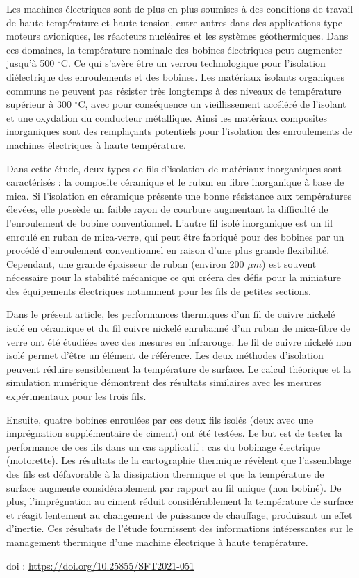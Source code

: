 {\normalsize
Les machines électriques sont de plus en plus soumises à des conditions de travail de haute température et haute tension, entre autres dans des applications type  moteurs avioniques, les réacteurs nucléaires et les systèmes géothermiques. Dans ces domaines, la température nominale des bobines électriques peut augmenter jusqu'à 500 $^{\circ}$C. Ce qui s'avère être un verrou technologique  pour  l'isolation diélectrique des enroulements et des bobines. Les matériaux isolants organiques communs ne peuvent pas résister très longtemps à des  niveaux de température supérieur à 300 $^{\circ}$C, avec pour conséquence un vieillissement accéléré de l'isolant et une oxydation du conducteur métallique. Ainsi les matériaux composites inorganiques sont des remplaçants potentiels pour l'isolation des enroulements de machines électriques à haute température.

Dans cette étude, deux types de fils d'isolation de matériaux inorganiques sont caractérisés : la composite céramique et le ruban en fibre inorganique à base de mica. Si l'isolation en céramique présente une bonne résistance aux températures élevées, elle possède un faible rayon de courbure augmentant la difficulté de l'enroulement de bobine conventionnel. L'autre fil isolé inorganique est un fil enroulé en ruban de mica-verre, qui peut être fabriqué pour des bobines par un procédé d'enroulement conventionnel en raison d'une plus grande flexibilité. Cependant, une grande épaisseur de ruban (environ 200 $\unit{\mu m}$) est souvent nécessaire pour la stabilité mécanique ce qui créera des défis pour la miniature des équipements électriques notamment pour les fils de petites sections.

Dans le présent article, les performances thermiques d'un fil de cuivre nickelé isolé en céramique et du fil cuivre nickelé enrubanné  d'un ruban de mica-fibre de verre ont été étudiées avec des mesures en infrarouge. Le  fil de cuivre nickelé non isolé permet d'être un élément de référence. Les deux méthodes d'isolation peuvent réduire sensiblement la température de surface. Le calcul théorique et la simulation numérique démontrent des résultats similaires avec les mesures expérimentaux pour les trois fils.

Ensuite, quatre bobines enroulées par ces deux fils isolés (deux avec une imprégnation supplémentaire de ciment) ont été testées. Le but est de tester la performance de ces fils dans un cas applicatif  : cas du bobinage électrique (motorette). Les résultats de la cartographie thermique révèlent que l'assemblage des fils est défavorable à la dissipation thermique et que la température de surface augmente considérablement par rapport au fil unique (non bobiné). De plus, l'imprégnation au ciment réduit considérablement la température de surface et réagit lentement au changement de puissance de chauffage, produisant un effet d'inertie. Ces résultats de l'étude fournissent des informations intéressantes sur le management thermique d'une machine électrique à haute température.

 \vfill doi : \url{https://doi.org/10.25855/SFT2021-051}

}
